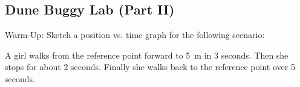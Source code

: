 \documentclass[../main-physics-problems.tex]{subfiles}
\begin{document}
\begin{questions}

\clearpage
\begin{EnvUplevel}
    \subsection{Dune Buggy Lab (Part II)}
\end{EnvUplevel}



\question
Warm-Up: Sketch a position vs. time graph for the following scenario:

A girl walks from the reference point forward to \SI{5}{m} in 3 seconds. Then she stops for about 2 seconds. Finally she walks back to the reference point over 5 seconds.


\end{questions}
\end{document}
